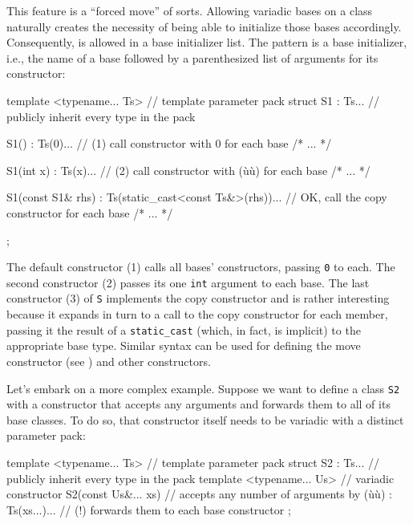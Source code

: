 This feature is a ``forced move'' of sorts. Allowing variadic bases on a
class naturally creates the necessity of being able to initialize those
bases accordingly. Consequently,  is
allowed in a base initializer list. The pattern is a base initializer,
i.e., the name of a base followed by a parenthesized list of arguments
for its constructor:

\begin{emcppslisting}
template <typename... Ts>  // template parameter pack
struct S1 : Ts...           // publicly inherit every type in the pack
{
    S1() : Ts(0)...         // (1) call constructor with 0 for each base
    { /* ... */ }

    S1(int x) : Ts(x)...    // (2) call constructor with (ù{}ù) for each base
    { /* ... */ }

    S1(const S1& rhs) : Ts(static_cast<const Ts&>(rhs))...
        // OK, call the copy constructor for each base
    { /* ... */ }
};
\end{emcppslisting}
    

\noindent The default constructor (1) calls all bases' constructors, passing
\lstinline!0! to each. The second constructor (2) passes its one
\lstinline!int! argument to each base. The last constructor (3) of
\lstinline!S! implements the copy constructor and is rather interesting
because it expands in turn to a call to the copy constructor for each
member, passing it the result of a \lstinline!static_cast! (which, in
fact, is implicit) to the appropriate base type. Similar syntax can be
used for defining the move constructor (see ) and
other constructors.

Let's embark on a more complex example. Suppose we want to define a
class \lstinline!S2! with a constructor that accepts any arguments and
forwards them to all of its base classes. To do so, that constructor
itself needs to be variadic with a distinct parameter pack:

\begin{emcppslisting}
template <typename... Ts>      // template parameter pack
struct S2 : Ts...              // publicly inherit every type in the pack
{
    template <typename... Us>  // variadic constructor
    S2(const Us&... xs)        // accepts any number of arguments by (ù{}ù)
    : Ts(xs...)...             // (!) forwards them to each base constructor
    { }
};
\end{emcppslisting}
    

